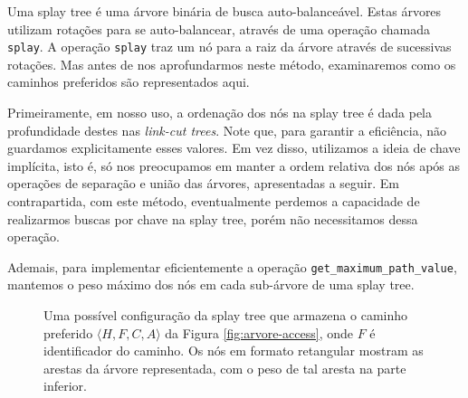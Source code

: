 Uma splay tree é uma árvore binária de busca auto-balanceável. Estas árvores utilizam rotações para se auto-balancear, através de uma operação chamada \texttt{splay}. A operação \texttt{splay} traz um nó para a raiz da árvore através de sucessivas rotações. Mas antes de nos aprofundarmos neste método, examinaremos como os caminhos preferidos são representados aqui.

Primeiramente, em nosso uso, a ordenação dos nós na splay tree é dada pela profundidade destes nas \emph{link-cut trees}. Note que, para garantir a eficiência, não guardamos explicitamente esses valores. Em vez disso, utilizamos a ideia de chave implícita, isto é, só nos preocupamos em manter a ordem relativa dos nós após as operações de separação e união das árvores, apresentadas a seguir. Em contrapartida, com este método, eventualmente perdemos a capacidade de realizarmos buscas por chave na splay tree, porém não necessitamos dessa operação.

Ademais, para implementar eficientemente a operação \texttt{get\_maximum\_path\_value}, mantemos o peso máximo dos nós em cada sub-árvore de uma splay tree.

\begin{figure}
    \centering
    \caption{Uma possível configuração da splay tree que armazena o caminho preferido $\langle H,F,C,A \rangle$ da Figura \ref{fig:arvore-access}, onde $F$ é identificador do caminho. Os nós em formato retangular mostram as arestas da árvore representada, com o peso de tal aresta na parte inferior.}
    \label{fig:splay-path}
\end{figure}

